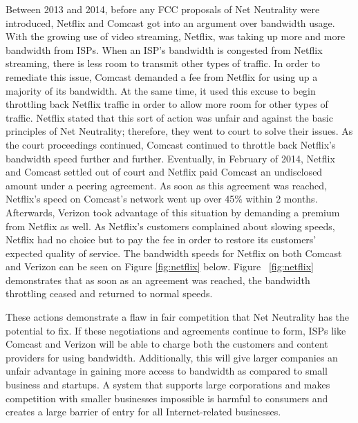 \documentclass{sigcomm-alternate}
\begin{document}
Between 2013 and 2014, before any FCC proposals of Net Neutrality were introduced, Netflix and Comcast got into an argument over bandwidth usage\cite{netflix}. With the growing use of video streaming, Netflix, was taking up more and more bandwidth from ISPs. When an ISP’s bandwidth is congested from Netflix streaming, there is less room to transmit other types of traffic. In order to remediate this issue, Comcast demanded a fee from Netflix for using up a majority of its bandwidth. At the same time, it used this excuse to begin throttling back Netflix traffic in order to allow more room for other types of traffic. Netflix stated that this sort of action was unfair and against the basic principles of Net Neutrality; therefore, they went to court to solve their issues. As the court proceedings continued, Comcast continued to throttle back Netflix’s bandwidth speed further and further. Eventually, in February of 2014, Netflix and Comcast settled out of court and Netflix paid Comcast an undisclosed amount under a peering agreement. As soon as this agreement was reached, Netflix’s speed on Comcast’s network went up over 45\% within 2 months. Afterwards, Verizon took advantage of this situation by demanding a premium from Netflix as well. As Netflix’s customers complained about slowing speeds, Netflix had no choice but to pay the fee in order to restore its customers’ expected quality of service. The bandwidth speeds for Netflix on both Comcast and Verizon can be seen on Figure \ref{fig:netflix} below. Figure ~\ref{fig:netflix} demonstrates that as soon as an agreement was reached, the bandwidth throttling ceased and returned to normal speeds.

These actions demonstrate a flaw in fair competition that Net Neutrality has the potential to fix. If these negotiations and agreements continue to form, ISPs like Comcast and Verizon will be able to charge both the customers and content providers for using bandwidth. Additionally, this will give larger companies an unfair advantage in gaining more access to bandwidth as compared to small business and startups. A system that supports large corporations and makes competition with smaller businesses impossible is harmful to consumers and creates a large barrier of entry for all Internet-related businesses.
\end{document}
